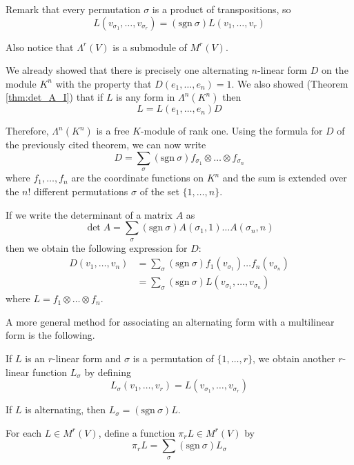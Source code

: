 Remark that every permutation $\sigma$ is a product of transpositions, so
\[
	L(v_{\sigma_1}, \ldots, v_{\sigma_r}) = (\text{sgn}~\sigma) L(v_1, \ldots, v_r)
\]

Also notice that $\Lambda^r(V)$ is a submodule of $M^r(V)$.

\begin{remark}
	We already showed that there is precisely one alternating $n$-linear form $D$ on the module $K^n$ with the property that $D(e_1, \ldots, e_n) = 1$. We also showed (Theorem \ref{thm:det_A_I}) that if $L$ is any form in $\Lambda^n(K^n)$ then
	\[
		L = L(e_1, \ldots, e_n)D
	\]
	
	Therefore, $\Lambda^n(K^n)$ is a free $K$-module of rank one. Using the formula for $D$ of the previously cited theorem, we can now write
	\[
		D = \sum_\sigma (\text{sgn}~\sigma) f_{\sigma_1} \otimes \ldots \otimes f_{\sigma_n}
	\]
	where $f_1, \ldots, f_n$ are the coordinate functions on $K^n$ and the sum is extended over the $n!$ different permutations $\sigma$ of the set $\{ 1, \ldots, n \}$.
	
	If we write the determinant of a matrix $A$ as
	\[
		\det A = \sum_\sigma (\text{sgn}~\sigma) A(\sigma_1, 1) \ldots A(\sigma_n, n)
	\]
	then we obtain the following expression for $D$:
	\begin{equation*}
		\begin{aligned}
			D(v_1, \ldots, v_n) &= \sum_\sigma (\text{sgn}~\sigma) f_1(v_{\sigma_1}) \ldots f_n(v_{\sigma_n}) \\
			&= \sum_\sigma (\text{sgn}~\sigma) L(v_{\sigma_1}, \ldots, v_{\sigma_n})
		\end{aligned}
	\end{equation*}
	where $L = f_1 \otimes \ldots \otimes f_n$.
\end{remark}

A more general method for associating an alternating form with a multilinear form is the following.

\begin{remark}
	If $L$ is an $r$-linear form and $\sigma$ is a permutation of $\{ 1, \ldots, r \}$, we obtain another $r$-linear function $L_\sigma$ by defining
	\[
		L_\sigma(v_1, \ldots, v_r) = L(v_{\sigma_1}, \ldots, v_{\sigma_r})
	\]
	
	If $L$ is alternating, then $L_\sigma = (\text{sgn}~\sigma) L$.
	
	For each $L \in M^r(V)$, define a function $\pi_r L \in M^r(V)$ by
	\[
		\pi_r L = \sum_\sigma (\text{sgn}~\sigma) L_\sigma
	\]
\end{remark}

